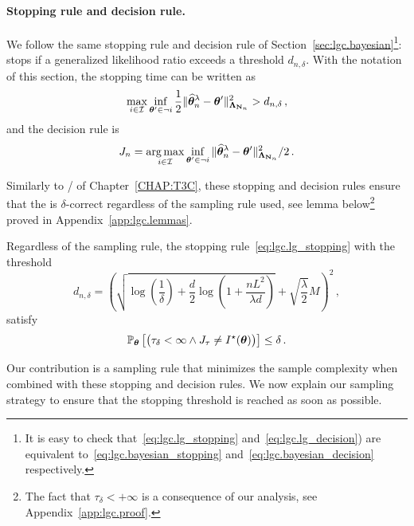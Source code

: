 \paragraph{Stopping rule and decision rule.}
We follow the same stopping rule and decision rule of Section~\ref{sec:lgc.bayesian}\footnote{It is easy to check that~\eqref{eq:lgc.lg_stopping} and~\eqref{eq:lgc.lg_decision}) are equivalent to~\eqref{eq:lgc.bayesian_stopping} and~\eqref{eq:lgc.bayesian_decision} respectively.}: \LG{} stops if a generalized likelihood ratio exceeds a threshold $d_{n,\delta}$. With the notation of this section, the stopping time can be written as
\begin{align}\label{eq:lgc.lg_stopping}
    \max_{i\in \mathcal{I}} \inf_{{\boldsymbol \theta}' \in \neg i}\frac{1}{2}\Vert \widehat{{\boldsymbol \theta}}_n^\lambda - {\boldsymbol \theta}' \Vert^2_{{\boldsymbol \Lambda}_{{\bf N}_n}} > d_{n,\delta}\,,
\end{align}
and the decision rule is 
\begin{align}\label{eq:lgc.lg_decision}
    J_n = \operatorname*{arg\,max}_{i\in \mathcal{I}} \inf_{{\boldsymbol \theta}' \in \neg i}\Vert \widehat{{\boldsymbol \theta}}_n^\lambda - {\boldsymbol \theta}' \Vert^2_{{\boldsymbol \Lambda}_{{\bf N}_n}}/2\,.
\end{align}

Similarly to \TCC{}/\TTTS{} of Chapter~\ref{CHAP:T3C}, these stopping and decision rules ensure that the \LG{} is $\delta$-correct regardless of the sampling rule used, see lemma below\footnote{The fact that $\tau_\delta <+\infty$ is a consequence of our analysis, see Appendix~\ref{app:lgc.proof}.} proved in Appendix~\ref{app:lgc.lemmas}.

\begin{lemma}\label{lemma:lgc.pac}
\begin{leftbar}[lemmabar]
Regardless of the sampling rule, the stopping rule~\eqref{eq:lgc.lg_stopping} with the threshold
\begin{equation} \label{eq:def_beta}
    d_{n,\delta} =\left( \sqrt{\log\left( \frac{1}{\delta}\right)+\frac{d}{2}\log\left(1+\frac{n L^2}{\lambda d} \right)} +\sqrt{\frac{\lambda}{2}}M\right)^2\,,
\end{equation}
satisfy
\[
    \mathbb{P}_{\boldsymbol \theta}\left[\big(\tau_{\delta} < \infty \wedge J_\tau \neq I^\star({\boldsymbol \theta})\big)\right] \leq \delta\,.
\]
\end{leftbar}
\end{lemma}
Our contribution is a sampling rule that minimizes the sample complexity when combined with these stopping and decision rules.
We now explain our sampling strategy to ensure that the stopping threshold is reached as soon as possible.

